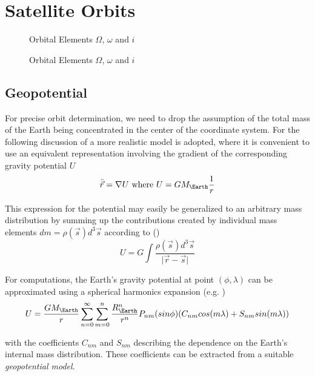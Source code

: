 \chapter{Satellite Orbits}
\label{ch:satellite-orbits}

\begin{figure}
\centering
{}

\caption{Orbital Elements $\Omega$, $\omega$ and $i$}
\label{fig:orbital-elements-Ooi}
\end{figure}

\begin{figure}
\centering
{}

\caption{Orbital Elements $\Omega$, $\omega$ and $i$}
\label{fig:eccentric-anomaly}
\end{figure}

\section{Geopotential}
For precise orbit determination, we need to drop the assumption of the total mass 
of the Earth being concentrated in the center of the coordinate system. For the
following discussion of a more realistic model is adopted, where it is convenient 
to use an equivalent representation involving the gradient of the corresponding 
gravity potential \(U\)
\begin{equation}
    \ddot{\vec{r}} = \nabla U \textrm{ where } U = G M_{\Earth} \frac{1}{r}
\end{equation}

This expression for the potential may easily be generalized to an arbitrary mass
distribution by summing up the contributions created by individual mass elements
\(dm = \rho(\vec{s}) d^3 \vec{s}\) according to (\cite{Montenbruck2000})
\begin{equation}
    U = G \int{\frac{\rho(\vec{s}) d^3 \vec{s}}{\lvert \vec{r} - \vec{s} \rvert}}
\end{equation}

For computations, the Earth's gravity potential at point \((\phi , \lambda)\) 
can be approximated using a spherical harmonics expansion 
(e.g. \cite{Montenbruck2000})
\begin{equation}
    U = \frac{G M_{\Earth}}{r} \sum_{n=0}^\infty \sum_{m=0}^n 
    \frac{R_{\Earth}^n}{r^n} P_{nm}(sin\phi) 
    (C_{nm} cos(m\lambda) + S_{nm} sin(m\lambda))
\end{equation}

with the coefficients \(C_{nm}\) and \(S_{nm}\) describing the dependence on the 
Earth's internal mass distribution. These coefficients can be extracted from a 
suitable  \emph{geopotential model}.

